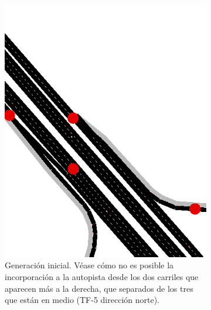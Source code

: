 \begin{figure}[ht]
    \centering
    \begin{subfigure}[t]{0.48\textwidth}
      \centering
      \includegraphics[width=\textwidth]{report/images/netedit-tf5-norte-mal.png}
      \caption{Generación inicial. Véase cómo no es posible la incorporación a la autopista desde los dos carriles que aparecen más a la derecha, que separados de los tres que están en medio (TF-5 dirección norte).}
      \label{fig:netedit-tf5-norte-mal}
    \end{subfigure}
    \hfill
    \begin{subfigure}[t]{0.48\textwidth}
      \centering

\end{subfigure}
\end{figure}
